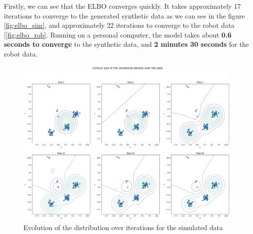 \documentclass{article}
\begin{document}
Firstly, we can see that the ELBO converges quickly. It takes approximately 17 iterations to converge to the generated synthetic data as we can see in the figure \ref{fig:elbo_sim}, and approximately 22 iterations to converge to the robot data [\ref{fig:elbo_rob}. Running on a personal computer, the model takes about \textbf{0.6 seconds to converge} to the synthetic data, and \textbf{2 minutes 30 seconds} for the robot data.

\begin{figure}[H]
    \centering
    \includegraphics[scale=0.4]{images/sampled_evolution.png}
    \caption{Evolution of the distribution over iterations for the simulated data}
    \label{fig:alg_evol}
\end{figure}
\end{document}
